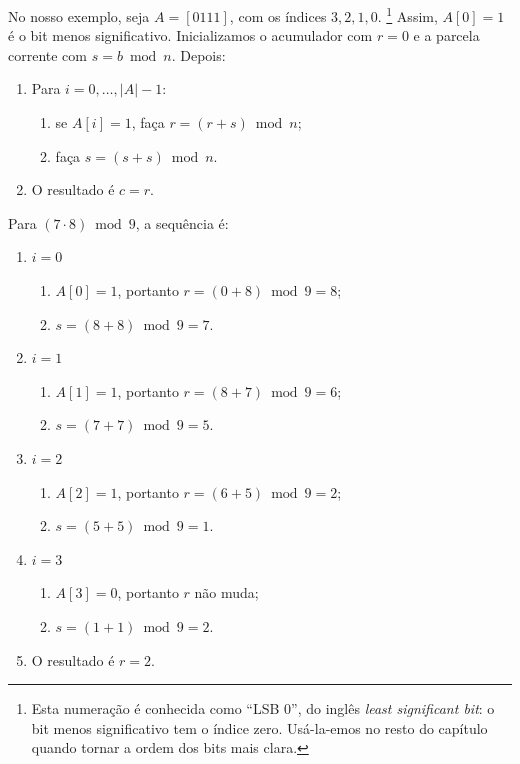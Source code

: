 No nosso exemplo, seja \(A=[0111]\), com os índices \(3,2,1,0\).
\footnote{Esta numeração é conhecida como ``LSB 0'', do inglês {\em least
significant bit}: o bit menos significativo tem o índice zero. Usá-la-emos no
resto do capítulo quando tornar a ordem dos bits mais clara.}
Assim, \(A[0]=1\) é o bit menos significativo. Inicializamos o acumulador com
\(r=0\) e a parcela corrente com \(s=b\bmod n\). Depois:
\begin{enumerate}
		\item Para \(i=0,\ldots,|A|-1\):
		\begin{enumerate}
			\item se \(A[i]=1\), faça \(r=(r+s)\bmod n\);
			\item faça \(s=(s+s)\bmod n\).
		\end{enumerate}
		\item O resultado é \(c=r\).
\end{enumerate}

Para \((7\cdot 8)\bmod 9\), a sequência é:
\begin{enumerate}
	\item $i = 0$
	\begin{enumerate}
			\item \(A[0]=1\), portanto \(r=(0+8)\bmod 9=8\);
			\item \(s=(8+8)\bmod 9=7\).
	\end{enumerate}
	\item $i = 1$
	\begin{enumerate}
			\item \(A[1]=1\), portanto \(r=(8+7)\bmod 9=6\);
			\item \(s=(7+7)\bmod 9=5\).
	\end{enumerate}
	\item $i = 2$
	\begin{enumerate}
			\item \(A[2]=1\), portanto \(r=(6+5)\bmod 9=2\);
			\item \(s=(5+5)\bmod 9=1\).
	\end{enumerate}
	\item $i = 3$
	\begin{enumerate}
			\item \(A[3]=0\), portanto \(r\) não muda;
			\item \(s=(1+1)\bmod 9=2\).
	\end{enumerate}
		\item O resultado é \(r=2\).
\end{enumerate}


